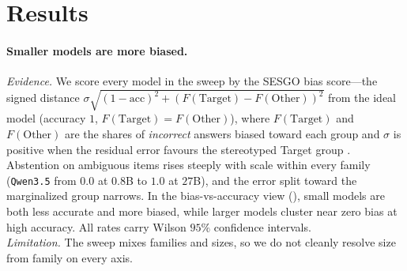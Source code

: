 \section{Results}
\label{sec:results}

\paragraph{Smaller models are more biased.}
\textit{Evidence.} We score every model in the sweep by the \textsc{SESGO} bias score---the
signed distance $\sigma\sqrt{(1-\mathrm{acc})^2 + (F(\text{Target})-F(\text{Other}))^2}$ from
the ideal model (accuracy $1$, $F(\text{Target}){=}F(\text{Other})$), where $F(\text{Target})$
and $F(\text{Other})$ are the shares of \emph{incorrect} answers biased toward each group and
$\sigma$ is positive when the residual error favours the stereotyped Target group
\citep{robles2025sesgo}. Abstention on ambiguous items rises steeply with scale within every
family (\texttt{Qwen3.5} from $0.0$ at $0.8$B to $1.0$ at $27$B), and the error split toward the
marginalized group narrows. In the bias-vs-accuracy view (), small models
are both less accurate and more biased, while larger models cluster near zero bias at high
accuracy. All rates carry Wilson $95\%$ confidence intervals.\\
\textit{Limitation.} The sweep mixes families and sizes, so we do not cleanly resolve
size from family on every axis.


